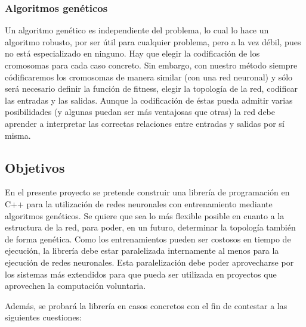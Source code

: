 \documentclass[a4paper,11pt]{article}
\begin{document}
\subsubsection{Algoritmos gen\'eticos}\label{anaFortYGene}

Un algoritmo gen\'etico es independiente del problema, lo cual lo hace un algoritmo robusto, por ser \'util para cualquier problema, pero a la vez d\'ebil, pues no est\'a especializado en ninguno. Hay que elegir la codificaci\'on de los cromosomas para cada caso concreto. Sin embargo, con nuestro m\'etodo siempre c\'odificaremos los cromosomas de manera similar (con una red neuronal) y s\'olo ser\'a necesario definir la funci\'on de fitness, elegir la topolog\'ia de la red, codificar las entradas y las salidas. Aunque la codificaci\'on de \'estas pueda admitir varias posibilidades (y algunas puedan ser m\'as ventajosas que otras) la red debe aprender a interpretar las correctas relaciones entre entradas y salidas por s\'i misma.

\subsection{Objetivos}\label{anaObjetivos}

En el presente proyecto se pretende construir una librer\'ia de programaci\'on en C++ para la utilizaci\'on de redes neuronales con entrenamiento mediante algoritmos gen\'eticos. Se quiere que sea lo m\'as flexible posible en cuanto a la estructura de la red, para poder, en un futuro, determinar la topolog\'ia tambi\'en de forma gen\'etica. Como los entrenamientos pueden ser costosos en tiempo de ejecuci\'on, la librer\'ia debe estar paralelizada internamente al menos para la ejecuci\'on de redes neuronales. Esta paralelizaci\'on debe poder aprovecharse por los sistemas m\'as extendidos para que pueda ser utilizada en proyectos que aprovechen la computaci\'on voluntaria.

 Adem\'as, se probar\'a la librer\'ia en casos concretos con el fin de contestar a las siguientes cuestiones:
\end{document}
